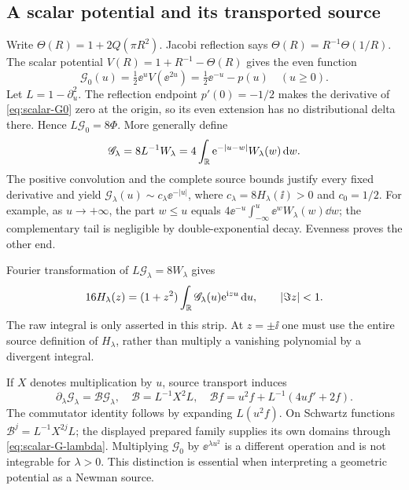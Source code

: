 \subsection{A scalar potential and its transported source}
Write \(\Theta(R)=1+2Q(\pi R^2)\). Jacobi reflection says
\(\Theta(R)=R^{-1}\Theta(1/R)\). The scalar potential
\(V(R)=1+R^{-1}-\Theta(R)\) gives the even function
\begin{equation}\label{eq:scalar-G0}
 \mathscr G_0(u)=\tfrac12\ee^u V(\ee^{2u})
 =\tfrac12\ee^{-u}-p(u)\quad(u\ge0).
\end{equation}
Let \(L=1-\partial_u^2\). The reflection endpoint \(p'(0)=-1/2\)
makes the derivative of \eqref{eq:scalar-G0} zero at the origin, so its
even extension has no distributional delta there. Hence
\(L\mathscr G_0=8\Phi\). More generally define
\begin{equation}\label{eq:scalar-G-lambda}
 \mathscr G_\lambda=8L^{-1}W_\lambda
 =4\int_\mathbb R \mathrm e^{-|u-w|}W_\lambda(w)\,\mathrm d w.
\end{equation}
The positive convolution and the complete source bounds justify every
fixed derivative and yield
\(\mathscr G_\lambda(u)\sim c_\lambda\ee^{-|u|}\), where
\(c_\lambda=8H_\lambda(\ii)>0\) and \(c_0=1/2\).
For example, as \(u\to+\infty\), the part \(w\le u\) equals
\(4\ee^{-u}\int_{-\infty}^u\ee^w W_\lambda(w)\dd w\); the complementary
tail is negligible by double-exponential decay. Evenness proves the
other end.

Fourier transformation of \(L\mathscr G_\lambda=8W_\lambda\) gives
\begin{equation}\label{eq:scalar-fourier}
 16H_\lambda(z)=(1+z^2)\int_\mathbb R\mathscr G_\lambda(u)\mathrm e^{\mathrm i zu}\,\mathrm d u,
 \qquad |\Im z|<1.
\end{equation}
The raw integral is only asserted in this strip. At \(z=\pm\ii\) one
must use the entire source definition of \(H_\lambda\), rather than
multiply a vanishing polynomial by a divergent integral.

If \(X\) denotes multiplication by \(u\), source transport induces
\begin{equation}\label{eq:scalar-transport}
 \partial_\lambda\mathscr G_\lambda=\mathcal B\mathscr G_\lambda,
 \quad \mathcal B=L^{-1}X^2L,
 \quad \mathcal Bf=u^2f+L^{-1}(4uf'+2f).
\end{equation}
The commutator identity follows by expanding \(L(u^2f)\).
On Schwartz functions \(\mathcal B^j=L^{-1}X^{2j}L\); the displayed
prepared family supplies its own domains through \eqref{eq:scalar-G-lambda}.
Multiplying \(\mathscr G_0\) by \(\ee^{\lambda u^2}\) is a different
operation and is not integrable for \(\lambda>0\). This distinction is
essential when interpreting a geometric potential as a Newman source.

